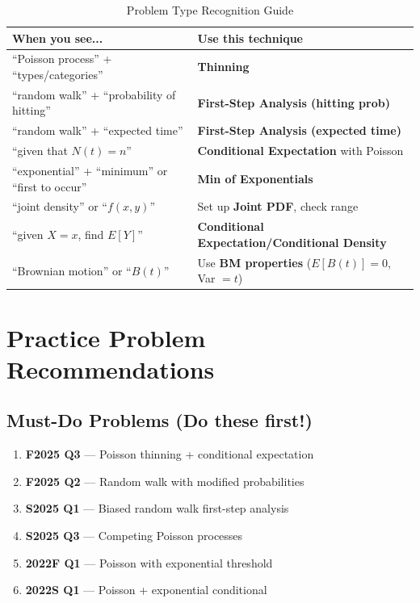 \documentclass[11pt,letterpaper]{article}
\begin{document}
\begin{table}[h]
\centering
\caption{Problem Type Recognition Guide}
\begin{tabularx}{\textwidth}{lX}
\toprule
\textbf{When you see...} & \textbf{Use this technique} \\
\midrule
``Poisson process'' + ``types/categories'' & \textbf{Thinning} \\
``random walk'' + ``probability of hitting'' & \textbf{First-Step Analysis (hitting prob)} \\
``random walk'' + ``expected time'' & \textbf{First-Step Analysis (expected time)} \\
``given that $N(t) = n$'' & \textbf{Conditional Expectation} with Poisson \\
``exponential'' + ``minimum'' or ``first to occur'' & \textbf{Min of Exponentials} \\
``joint density'' or ``$f(x,y)$'' & Set up \textbf{Joint PDF}, check range \\
``given $X = x$, find $E[Y]$'' & \textbf{Conditional Expectation/Conditional Density} \\
``Brownian motion'' or ``$B(t)$'' & Use \textbf{BM properties} ($E[B(t)] = 0$, Var $= t$) \\
\bottomrule
\end{tabularx}
\end{table}

\section{Practice Problem Recommendations}

\subsection{Must-Do Problems (Do these first!)}

\begin{enumerate}[leftmargin=*]
  \item \textbf{F2025 Q3} --- Poisson thinning + conditional expectation
  \item \textbf{F2025 Q2} --- Random walk with modified probabilities
  \item \textbf{S2025 Q1} --- Biased random walk first-step analysis
  \item \textbf{S2025 Q3} --- Competing Poisson processes
  \item \textbf{2022F Q1} --- Poisson with exponential threshold
  \item \textbf{2022S Q1} --- Poisson + exponential conditional
\end{enumerate}
\end{document}
